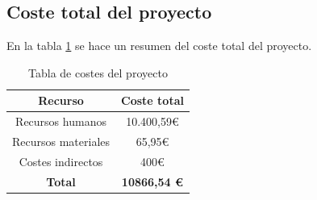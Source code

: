 \subsection{Coste total del proyecto}

En la tabla \ref{tab:: tablaCostes} se hace un resumen del coste total del proyecto.
	\begin{table}[htbp]
	\centering
	\begin{tabular}{|c|c|}
	\hline
	\textbf{Recurso}        & \textbf{Coste total } 	\\\hline
	Recursos   humanos  	& 10.400,59\euro             \\
	Recursos   materiales 	& 65,95\euro           		\\
	Costes   indirectos     & 400\euro      			    \\\hline 
	\textbf{Total}          & \textbf{	10866,54 \euro} \\     
	\hline
	\end{tabular}
	\caption{Tabla de costes del proyecto}
	\label{tab:: tablaCostes}
	\end{table}